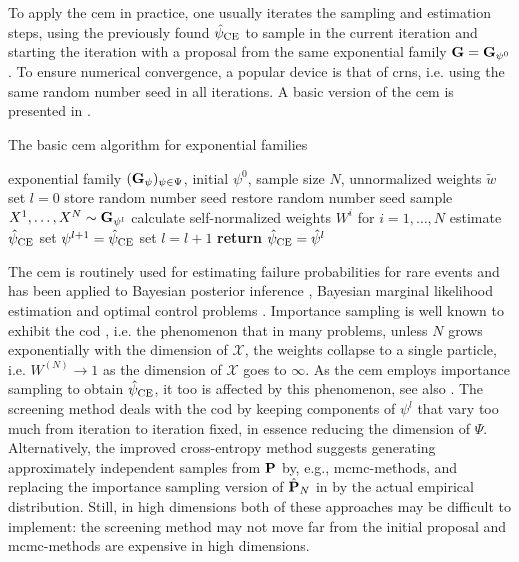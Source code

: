 To apply the \acrshort{cem} in practice, one usually iterates the sampling and estimation steps, using the previously found $\hpce$ to sample in the current iteration and starting the iteration with a proposal from the same exponential family $\G = \G_{\psi^{0}}$. To ensure numerical convergence, a popular device is that of \glspl{crn}, i.e. using the same random number seed in all iterations. A basic version of the \acrshort{cem} is presented in .

\begin{algorithm}
    \caption{The basic \gls{cem} algorithm for exponential families}
    \label{alg:cem-basic}
    \begin{algorithmic}[1]
        \Require exponential family $(\G_{\psi})_{\psi \in\Psi}$, initial $\psi^{0}$, sample size $N$, unnormalized weights $\tilde w$
        \State set $l = 0$
        \State store random number seed
        \Repeat
            \State restore random number seed
            \State sample $X^{1}, \dots, X^{N} \sim \G_{\psi^{l}}$
            \State calculate self-normalized weights $W^{i}$ for $i = 1, \dots, N$ 
            \State estimate $\hpce$ 
            \State set $\psi^{l + 1} = \hpce$
            \State set $l = l + 1$
        \State \textbf{return} $\hpce = \hat\psi^{l}$
    \end{algorithmic}
\end{algorithm}

The \gls{cem} is routinely used for estimating failure probabilities for rare events \citep{Homem-de-Mello2007Study} and has been applied to Bayesian posterior inference \citep{Engel2023Bayesian,Ehre2023Certified}, Bayesian marginal likelihood estimation \citep{Chan2012Marginal} and optimal control problems \citep{Kappen2016Adaptive,Zhang2014Applications}.
Importance sampling is well known to exhibit the \gls{cod} \citep{Bengtsson2008Curseofdimensionality}, i.e. the phenomenon that in many problems, unless $N$ grows exponentially with the dimension of $\mathcal X$, the weights collapse to a single particle, i.e. $W^{(N)} \to 1$ as the dimension of $\mathcal X$ goes to $\infty$. As the \acrshort{cem} employs importance sampling to obtain $\hpce$, it too is affected by this phenomenon, see also . 
The screening method \citep{Rubinstein2009How} deals with the \acrshort{cod} by keeping components of $\psi^{l}$ that vary too much from iteration to iteration fixed, in essence reducing the dimension of $\Psi$. 
Alternatively, the improved cross-entropy method \citep{Chan2012Improved} suggests generating approximately independent samples from $\P$ by, e.g., \acrshort{mcmc}-methods, and replacing the importance sampling version of $\hat\P_{N}$  in  by the actual empirical distribution.
Still, in high dimensions both of these approaches may be difficult to implement: the screening method may not move far from the initial proposal and \acrshort{mcmc}-methods are expensive in high dimensions.


